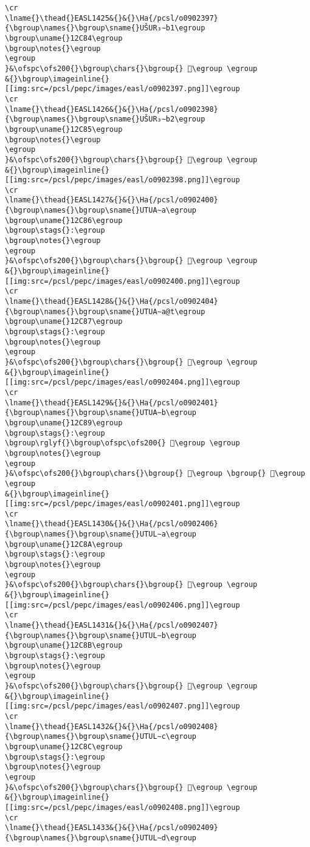 \begin{verbatim}
\cr
\lname{}\thead{}EASL1425&{}&{}\Ha{/pcsl/o0902397}{\bgroup\names{}\bgroup\sname{}UŠUR₃∼b1\egroup
\bgroup\uname{}12C84\egroup
\bgroup\notes{}\egroup
\egroup
}&\ofspc\ofs200{}\bgroup\chars{}\bgroup{} 𒲄\egroup \egroup
&{}\bgroup\imageinline{}[[img:src=/pcsl/pepc/images/easl/o0902397.png]]\egroup
\cr
\lname{}\thead{}EASL1426&{}&{}\Ha{/pcsl/o0902398}{\bgroup\names{}\bgroup\sname{}UŠUR₃∼b2\egroup
\bgroup\uname{}12C85\egroup
\bgroup\notes{}\egroup
\egroup
}&\ofspc\ofs200{}\bgroup\chars{}\bgroup{} 𒲅\egroup \egroup
&{}\bgroup\imageinline{}[[img:src=/pcsl/pepc/images/easl/o0902398.png]]\egroup
\cr
\lname{}\thead{}EASL1427&{}&{}\Ha{/pcsl/o0902400}{\bgroup\names{}\bgroup\sname{}UTUA∼a\egroup
\bgroup\uname{}12C86\egroup
\bgroup\stags{}:\egroup
\bgroup\notes{}\egroup
\egroup
}&\ofspc\ofs200{}\bgroup\chars{}\bgroup{} 𒲆\egroup \egroup
&{}\bgroup\imageinline{}[[img:src=/pcsl/pepc/images/easl/o0902400.png]]\egroup
\cr
\lname{}\thead{}EASL1428&{}&{}\Ha{/pcsl/o0902404}{\bgroup\names{}\bgroup\sname{}UTUA∼a@t\egroup
\bgroup\uname{}12C87\egroup
\bgroup\stags{}:\egroup
\bgroup\notes{}\egroup
\egroup
}&\ofspc\ofs200{}\bgroup\chars{}\bgroup{} 𒲇\egroup \egroup
&{}\bgroup\imageinline{}[[img:src=/pcsl/pepc/images/easl/o0902404.png]]\egroup
\cr
\lname{}\thead{}EASL1429&{}&{}\Ha{/pcsl/o0902401}{\bgroup\names{}\bgroup\sname{}UTUA∼b\egroup
\bgroup\uname{}12C89\egroup
\bgroup\stags{}:\egroup
\bgroup\rglyf{}\bgroup\ofspc\ofs200{} 𒲉\egroup \egroup
\bgroup\notes{}\egroup
\egroup
}&\ofspc\ofs200{}\bgroup\chars{}\bgroup{} 𒲈\egroup \bgroup{} 𒲉\egroup \egroup
&{}\bgroup\imageinline{}[[img:src=/pcsl/pepc/images/easl/o0902401.png]]\egroup
\cr
\lname{}\thead{}EASL1430&{}&{}\Ha{/pcsl/o0902406}{\bgroup\names{}\bgroup\sname{}UTUL∼a\egroup
\bgroup\uname{}12C8A\egroup
\bgroup\stags{}:\egroup
\bgroup\notes{}\egroup
\egroup
}&\ofspc\ofs200{}\bgroup\chars{}\bgroup{} 𒲊\egroup \egroup
&{}\bgroup\imageinline{}[[img:src=/pcsl/pepc/images/easl/o0902406.png]]\egroup
\cr
\lname{}\thead{}EASL1431&{}&{}\Ha{/pcsl/o0902407}{\bgroup\names{}\bgroup\sname{}UTUL∼b\egroup
\bgroup\uname{}12C8B\egroup
\bgroup\stags{}:\egroup
\bgroup\notes{}\egroup
\egroup
}&\ofspc\ofs200{}\bgroup\chars{}\bgroup{} 𒲋\egroup \egroup
&{}\bgroup\imageinline{}[[img:src=/pcsl/pepc/images/easl/o0902407.png]]\egroup
\cr
\lname{}\thead{}EASL1432&{}&{}\Ha{/pcsl/o0902408}{\bgroup\names{}\bgroup\sname{}UTUL∼c\egroup
\bgroup\uname{}12C8C\egroup
\bgroup\stags{}:\egroup
\bgroup\notes{}\egroup
\egroup
}&\ofspc\ofs200{}\bgroup\chars{}\bgroup{} 𒲌\egroup \egroup
&{}\bgroup\imageinline{}[[img:src=/pcsl/pepc/images/easl/o0902408.png]]\egroup
\cr
\lname{}\thead{}EASL1433&{}&{}\Ha{/pcsl/o0902409}{\bgroup\names{}\bgroup\sname{}UTUL∼d\egroup

\end{verbatim}

